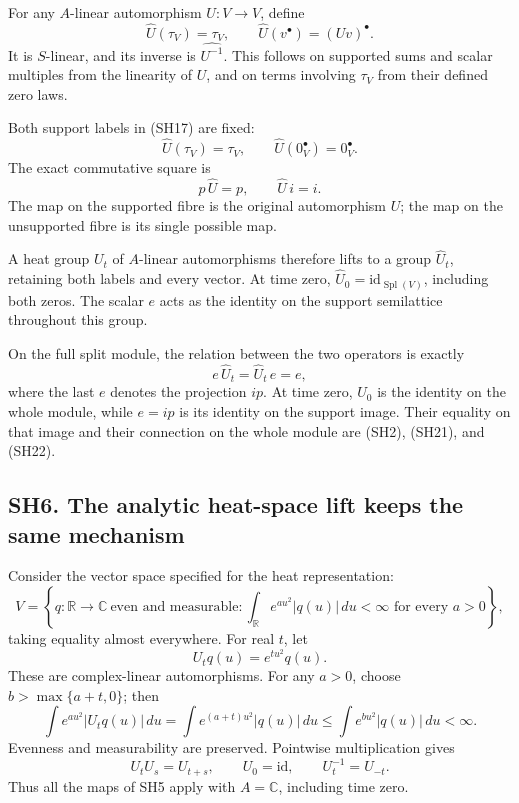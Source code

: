 \documentclass[
]{article}
\begin{document}
For any \(A\)-linear automorphism \(U:V\to V\), define \[
\widehat U(\tau_V)=\tau_V,\qquad
\widehat U(v^\bullet)=(Uv)^\bullet.
\tag{SH19}
\] It is \(S\)-linear, and its inverse is \(\widehat{U^{-1}}\). This
follows on supported sums and scalar multiples from the linearity of
\(U\), and on terms involving \(\tau_V\) from their defined zero laws.

Both support labels in (SH17) are fixed: \[
\widehat U(\tau_V)=\tau_V,\qquad
\widehat U(0_V^\bullet)=0_V^\bullet.
\tag{SH20}
\] The exact commutative square is \[
p\,\widehat U=p,\qquad \widehat U\,i=i.
\tag{SH21}
\] The map on the supported fibre is the original automorphism \(U\);
the map on the unsupported fibre is its single possible map.

A heat group \(U_t\) of \(A\)-linear automorphisms therefore lifts to a
group \(\widehat U_t\), retaining both labels and every vector. At time
zero, \(\widehat U_0=\mathrm{id}_{\operatorname{Spl}(V)}\), including
both zeros. The scalar \(e\) acts as the identity on the support
semilattice throughout this group.

On the full split module, the relation between the two operators is
exactly \[
e\,\widehat U_t=\widehat U_t\,e=e,
\tag{SH22}
\] where the last \(e\) denotes the projection \(i p\). At time zero,
\(\widehat U_0\) is the identity on the whole module, while \(e=ip\) is
its identity on the support image. Their equality on that image and
their connection on the whole module are (SH2), (SH21), and (SH22).

\subsection{SH6. The analytic heat-space lift keeps the same
mechanism}\label{sh6.-the-analytic-heat-space-lift-keeps-the-same-mechanism}

Consider the vector space specified for the heat representation: \[
V=\left\{q:\mathbb R\to\mathbb C\ \text{even and measurable}:
\int_{\mathbb R}e^{a u^2}|q(u)|\,du<\infty
\text{ for every }a>0\right\},
\tag{SH23}
\] taking equality almost everywhere. For real \(t\), let \[
U_tq(u)=e^{tu^2}q(u).
\tag{SH24}
\] These are complex-linear automorphisms. For any \(a>0\), choose
\(b>\max\{a+t,0\}\); then \[
\int e^{au^2}|U_tq(u)|\,du
=\int e^{(a+t)u^2}|q(u)|\,du
\le\int e^{bu^2}|q(u)|\,du<\infty.
\] Evenness and measurability are preserved. Pointwise multiplication
gives \[
U_tU_s=U_{t+s},\qquad U_0=\mathrm{id},\qquad U_t^{-1}=U_{-t}.
\tag{SH25}
\] Thus all the maps of SH5 apply with \(A=\mathbb C\), including time
zero.
\end{document}

